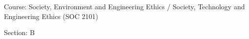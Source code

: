 \begin{titlepage}
\vspace{.2cm}

\begin{center}
    \parbox{0.6\textwidth}{ %
        \centering %
        {\normalsize
        Course: Society, Environment and Engineering Ethics / Society, Technology and Engineering Ethics (SOC 2101)
        }
    }
\end{center}

\begin{center}
    {\normalsize
    Section: B
    }
\end{center}






\end{titlepage}
